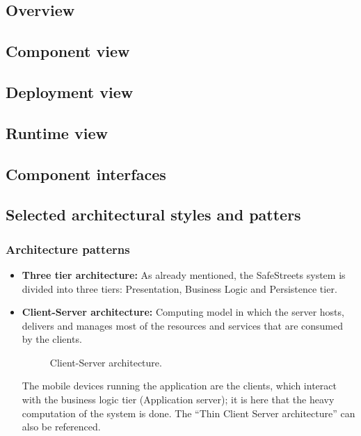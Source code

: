 \subsection{Overview}


\subsection{Component view}


\subsection{Deployment view}


\subsection{Runtime view}


\subsection{Component interfaces}


\subsection{Selected architectural styles and patters}

\subsubsection{Architecture patterns}
\begin{itemize}
    \item 
    \textbf{Three tier architecture:} As already mentioned, the SafeStreets system is divided into three tiers: Presentation, Business Logic and Persistence tier.
    \item
    \textbf{Client-Server architecture:} Computing model in which the server hosts, delivers and manages most of the resources and services that are consumed by the clients.

    \begin{figure}[H]
    \centering
    \caption{\label{fig:api-usage}Client-Server architecture.}
    \end{figure}

    The mobile devices running the application are the clients, which interact with the business logic tier (Application server); it is here that the heavy computation of the system is done. The “Thin Client Server architecture” can also be referenced.
\end{itemize}

